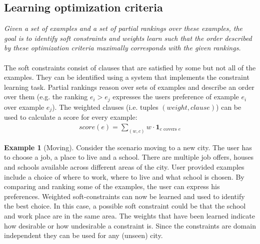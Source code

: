 \documentclass[letterpaper]{article}
\theoremstyle{definition}
\newtheorem{example}{Example}
\begin{document}


\subsection{Learning optimization criteria}
\emph{Given a set of examples and a set of partial rankings over these examples, the goal is to identify soft constraints and weights learn such that the order described by these optimization criteria maximally corresponds with the given rankings.}
\\\\
The soft constraints consist of clauses that are satisfied by some but not all of the examples.
They can be identified using a system that implements the constraint learning task.
Partial rankings reason over sets of examples and describe an order over them (e.g. the ranking $e_i > e_j$ expresses the users preference of example $e_i$ over example $e_j$).
The weighted clauses (i.e. tuples $(weight, clause)$) can be used to calculate a score for every example:
\begin{eqnarray*}
  score(e) = \sum\limits_{(\mathit{w}, \mathit{c})} \mathit{w} \cdot \mathbf{1}_{c \text{ covers } e}
\end{eqnarray*}

\begin{example}[Moving]
  \label{ex:moving}
  Consider the scenario moving to a new city.
  The user has to choose a job, a place to live and a school.
  There are multiple job offers, houses and schools available across different areas of the city.
  User provided examples include a choice of where to work, where to live and what school is chosen.
  By comparing and ranking some of the examples, the user can express his preferences.
  Weighted soft-constraints can now be learned and used to identify the best choice.
  In this case, a possible soft constraint could be that the school and work place are in the same area.
  The weights that have been learned indicate how desirable or how undesirable a constraint is.
  Since the constraints are domain independent they can be used for any (unseen) city.
\end{example}
\end{document}
